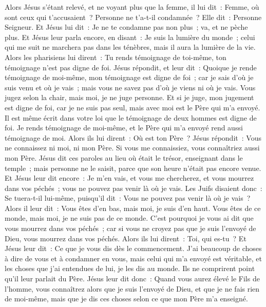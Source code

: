 \begin{multicols}{2}
Alors Jésus s'étant relevé, et ne voyant plus que la femme, il lui dit~: Femme, où sont ceux qui t'accusaient~? Personne ne t'a-t-il condamnée~?
Elle dit~: Personne Seigneur. Et Jésus lui dit~: Je ne te condamne pas non plus~; va, et ne pèche plus.
Et Jésus leur parla encore, en disant~: Je suis la lumière du monde~; celui qui me suit ne marchera pas dans les ténèbres, mais il aura la lumière de la vie.
Alors les pharisiens lui dirent~: Tu rends témoignage de toi-même, ton témoignage n'est pas digne de foi.
Jésus répondit, et leur dit~: Quoique je rende témoignage de moi-même, mon témoignage est digne de foi~; car je sais d'où je suis venu et où je vais~; mais vous ne savez pas d'où je viens ni où je vais.
Vous jugez selon la chair, mais moi, je ne juge personne.
Et si je juge, mon jugement est digne de foi, car je ne suis pas seul, mais avec moi est le Père qui m'a envoyé.
Il est même écrit dans votre loi que le témoignage de deux hommes est digne de foi.
Je rends témoignage de moi-même, et le Père qui m'a envoyé rend aussi témoignage de moi.
Alors ils lui dirent~: Où est ton Père~? Jésus répondit~: Vous ne connaissez ni moi, ni mon Père. Si vous me connaissiez, vous connaîtriez aussi mon Père.
Jésus dit ces paroles au lieu où était le trésor, enseignant dans le temple~; mais personne ne le saisit, parce que son heure n'était pas encore venue.
Et Jésus leur dit encore~: Je m'en vais, et vous me chercherez, et vous mourrez dans vos péchés~; vous ne pouvez pas venir là où je vais.
Les Juifs disaient donc~: Se tuera-t-il lui-même, puisqu'il dit~: Vous ne pouvez pas venir là où je vais~?
Alors il leur dit~: Vous êtes d'en bas, mais moi, je suis d'en haut. Vous êtes de ce monde, mais moi, je ne suis pas de ce monde.
C'est pourquoi je vous ai dit que vous mourrez dans vos péchés~; car si vous ne croyez pas que je suis l'envoyé de Dieu, vous mourrez dans vos péchés.
Alors ils lui dirent~: Toi, qui es-tu~? Et Jésus leur dit~: Ce que je vous dis dès le commencement.
J'ai beaucoup de choses à dire de vous et à condamner en vous, mais celui qui m'a envoyé est véritable, et les choses que j'ai entendues de lui, je les dis au monde.
Ils ne comprirent point qu'il leur parlait du Père.
Jésus leur dit donc~: Quand vous aurez élevé le Fils de l'homme, vous connaîtrez alors que je suis l'envoyé de Dieu, et que je ne fais rien de moi-même, mais que je dis ces choses selon ce que mon Père m'a enseigné.

\end{multicols}
